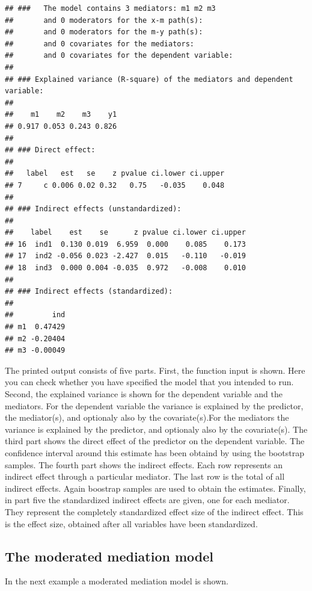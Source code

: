\documentclass[man,floatsintext]{apa6}
\theoremstyle{definition}
\theoremstyle{definition}
\theoremstyle{definition}
\theoremstyle{remark}
\begin{document}
\begin{verbatim}
## ###   The model contains 3 mediators: m1 m2 m3 
##       and 0 moderators for the x-m path(s): 
##       and 0 moderators for the m-y path(s): 
##       and 0 covariates for the mediators: 
##       and 0 covariates for the dependent variable:
## 
## ### Explained variance (R-square) of the mediators and dependent variable:
## 
##    m1    m2    m3    y1 
## 0.917 0.053 0.243 0.826 
## 
## ### Direct effect:
## 
##   label   est   se    z pvalue ci.lower ci.upper
## 7     c 0.006 0.02 0.32   0.75   -0.035    0.048
## 
## ### Indirect effects (unstandardized):
## 
##    label    est    se      z pvalue ci.lower ci.upper
## 16  ind1  0.130 0.019  6.959  0.000    0.085    0.173
## 17  ind2 -0.056 0.023 -2.427  0.015   -0.110   -0.019
## 18  ind3  0.000 0.004 -0.035  0.972   -0.008    0.010
## 
## ### Indirect effects (standardized):
## 
##         ind
## m1  0.47429
## m2 -0.20404
## m3 -0.00049
\end{verbatim}

The printed output consists of five parts. First, the function input is
shown. Here you can check whether you have specified the model that you
intended to run. Second, the explained variance is shown for the
dependent variable and the mediators. For the dependent variable the
variance is explained by the predictor, the mediator(s), and optionaly
also by the covariate(s).For the mediators the variance is explained by
the predictor, and optionaly also by the covariate(s). The third part
shows the direct effect of the predictor on the dependent variable. The
confidence interval around this estimate has been obtaind by using the
bootstrap samples. The fourth part shows the indirect effects. Each row
represents an indirect effect through a particular mediator. The last
row is the total of all indirect effects. Again boostrap samples are
used to obtain the estimates. Finally, in part five the standardized
indirect effects are given, one for each mediator. They represent the
completely standardized effect size of the indirect effect. This is the
effect size, obtained after all variables have been standardized.

\subsection{The moderated mediation
model}\label{the-moderated-mediation-model}

In the next example a moderated mediation model is shown.
\end{document}
